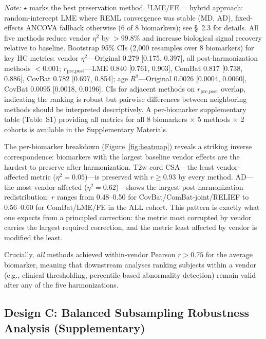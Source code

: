 \documentclass[12pt,a4paper]{article}
\begin{document}
\begin{table}[H]
\begin{tabular}{llccccc}
\bottomrule
\end{tabular}
\vspace{4pt}
\par\small\textit{Note:} $\star$ marks the best preservation method. $^\dagger$LME/FE = hybrid approach: random-intercept LME where REML convergence was stable (MD, AD), fixed-effects ANCOVA fallback otherwise (6 of 8 biomarkers); see \S~2.3 for details. All five methods reduce vendor $\eta^2$ by $>99.8\%$ and increase biological signal recovery relative to baseline. Bootstrap 95\% CIs (2,000 resamples over 8 biomarkers) for key HC metrics: vendor $\eta^2$---Original 0.279 [0.175, 0.397], all post-harmonization methods $< 0.001$; $r_{\text{pre,post}}$---LME 0.840 [0.761, 0.903], ComBat 0.817 [0.738, 0.886], CovBat 0.782 [0.697, 0.854]; age $R^2$---Original 0.0026 [0.0004, 0.0060], CovBat 0.0095 [0.0018, 0.0196]. CIs for adjacent methods on $r_{\text{pre,post}}$ overlap, indicating the ranking is robust but pairwise differences between neighboring methods should be interpreted descriptively. A per-biomarker supplementary table (Table~S1) providing all metrics for all 8 biomarkers $\times$ 5 methods $\times$ 2 cohorts is available in the Supplementary Materials.
\end{table}

The per-biomarker breakdown (Figure~\ref{fig:heatmap}) reveals a striking inverse correspondence: biomarkers with the largest baseline vendor effects are the hardest to preserve after harmonization. T2w cord CSA---the least vendor-affected metric ($\eta^2 = 0.05$)---is preserved with $r \geq 0.93$ by every method. AD---the most vendor-affected ($\eta^2 = 0.62$)---shows the largest post-harmonization redistribution: $r$ ranges from 0.48--0.50 for CovBat/ComBat-joint/RELIEF to 0.56--0.60 for ComBat/LME/FE in the ALL cohort. This pattern is exactly what one expects from a principled correction: the metric most corrupted by vendor carries the largest required correction, and the metric least affected by vendor is modified the least.

Crucially, \emph{all} methods achieved within-vendor Pearson $r > 0.75$ for the average biomarker, meaning that downstream analyses ranking subjects within a vendor (e.g., clinical thresholding, percentile-based abnormality detection) remain valid after any of the five harmonizations.

\subsection{Design C: Balanced Subsampling Robustness Analysis (Supplementary)}
\end{document}
